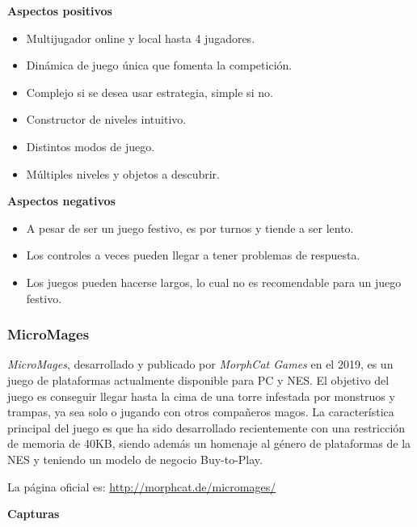 \textbf{Aspectos positivos}
\begin{itemize}
    \item Multijugador online y local hasta 4 jugadores.
    \item Dinámica de juego única que fomenta la competición.
    \item Complejo si se desea usar estrategia, simple si no.
    \item Constructor de niveles intuitivo.
    \item Distintos modos de juego.
    \item Múltiples niveles y objetos a descubrir.
\end{itemize}

\textbf{Aspectos negativos}
\begin{itemize}
    \item A pesar de ser un juego festivo, es por turnos y tiende a ser lento.
    \item Los controles a veces pueden llegar a tener problemas de respuesta.
    \item Los juegos pueden hacerse largos, lo cual no es recomendable para un juego festivo.
\end{itemize}


\subsubsection{MicroMages} \emph{MicroMages}, desarrollado y publicado por
\emph{MorphCat Games} en el 2019, es un juego de plataformas actualmente
disponible para PC y NES. El objetivo del juego es conseguir llegar hasta la
cima de una torre infestada por monstruos y trampas, ya sea solo o jugando con
otros compañeros magos. La característica principal del juego es que ha sido
desarrollado recientemente con una restricción de memoria de 40KB, siendo además
un homenaje al género de plataformas de la NES y teniendo un modelo de negocio
Buy-to-Play.

La página oficial es:
\url{http://morphcat.de/micromages/}

\textbf{Capturas}


